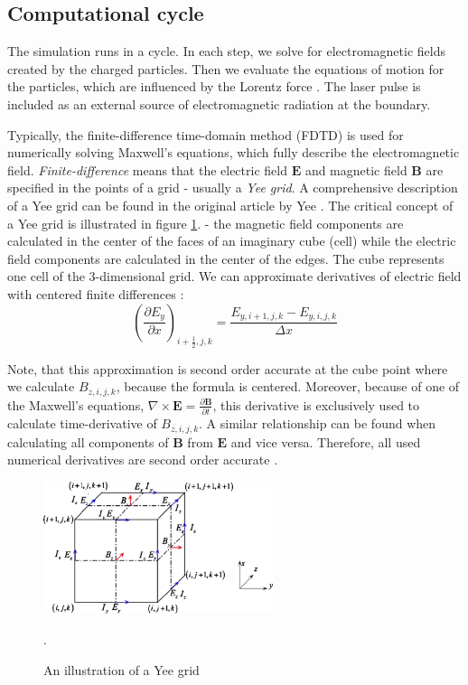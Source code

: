 \subsection*{Computational cycle}
The simulation runs in a cycle. In each step, we solve for electromagnetic fields created by the charged particles. Then we evaluate the equations of motion for the particles, which are influenced by the Lorentz force \cite{birdsall1985}. The laser pulse is included as an external source of electromagnetic radiation at the boundary.

Typically, the finite-difference time-domain method (FDTD) is used for numerically solving Maxwell's equations, which fully describe the electromagnetic field. \textit{Finite-difference} means that the electric field $\bm{E}$ and magnetic field $\bm{B}$ are specified in the points of a grid - usually a \textit{Yee grid}. A comprehensive description of a Yee grid can be found in the original article by Yee \cite{yee1966}. The critical concept of a Yee grid is illustrated in figure \ref{fig:yee-grid}. - the magnetic field components are calculated in the center of the faces of an imaginary cube (cell) while the electric field components are calculated in the center of the edges. The cube represents one cell of the 3-dimensional grid. We can approximate derivatives of electric field with centered finite differences \cite{arber2015}:
\begin{equation}
	\label{eq:num-der}
	\left(\frac{\partial E_y}{\partial x}\right)_{i+\frac{1}{2},j,k} = \frac{E_{y,i+1,j,k}-E_{y,i,j,k}}{\Delta x} 
\end{equation}

Note, that this approximation is second order accurate at the cube point where we calculate $B_{z,i,j,k}$, because the formula is centered. Moreover, because of one of the Maxwell's equations, $\nabla \times \bm{E} = \frac{\partial \bm{B}}{\partial t}$, this derivative is exclusively used to calculate time-derivative of $B_{z,i,j,k}$. A similar relationship can be found when calculating all components of $\bm{B}$ from $\bm{E}$ and vice versa. Therefore, all used numerical derivatives are second order accurate \cite{arber2015}.

\begin{figure}[t]
	\centering
	\includegraphics[width=0.6\textwidth]{figures/yee-grid}
	\caption{An illustration of a Yee grid \cite{wang2010}}.
	\label{fig:yee-grid}
\end{figure}

